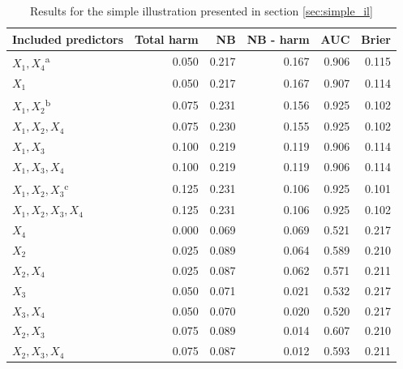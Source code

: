 \begin{table}[h!]
\centering
\small
\caption[Results for the simple illustration]{Results for the simple illustration presented in section \ref{sec:simple_il}}
\label{tab:varsel:simple}
\begin{tabularx}{\textwidth}{X r r r r r}
\toprule
\textbf{Included predictors} & \textbf{Total harm} & \textbf{NB} & \textbf{\gls{NB} - harm} & \textbf{AUC} & \textbf{Brier} \\
\midrule
$X_1, X_4$\textsuperscript{a} & 0.050 & 0.217 & 0.167 & 0.906 & 0.115 \\
$X_1$ & 0.050 & 0.217 & 0.167 & 0.907 & 0.114 \\
$X_1, X_2$\textsuperscript{b} & 0.075 & 0.231 & 0.156 & 0.925 & 0.102 \\
$X_1, X_2, X_4$ & 0.075 & 0.230 & 0.155 & 0.925 & 0.102 \\
$X_1, X_3$ & 0.100 & 0.219 & 0.119 & 0.906 & 0.114 \\
$X_1, X_3, X_4$ & 0.100 & 0.219 & 0.119 & 0.906 & 0.114 \\
$X_1, X_2, X_3$\textsuperscript{c} & 0.125 & 0.231 & 0.106 & 0.925 & 0.101 \\
$X_1, X_2, X_3, X_4$ & 0.125 & 0.231 & 0.106 & 0.925 & 0.102 \\
$X_4$ & 0.000 & 0.069 & 0.069 & 0.521 & 0.217 \\
$X_2$ & 0.025 & 0.089 & 0.064 & 0.589 & 0.210 \\
$X_2, X_4$ & 0.025 & 0.087 & 0.062 & 0.571 & 0.211 \\
$X_3$ & 0.050 & 0.071 & 0.021 & 0.532 & 0.217 \\
$X_3, X_4$ & 0.050 & 0.070 & 0.020 & 0.520 & 0.217 \\
$X_2, X_3$ & 0.075 & 0.089 & 0.014 & 0.607 & 0.210 \\
$X_2, X_3, X_4$ & 0.075 & 0.087 & 0.012 & 0.593 & 0.211 \\
\bottomrule
\end{tabularx}
\par\noindent{}
\end{table}

